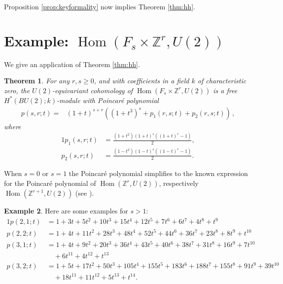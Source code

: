 \documentclass[oneside, a4paper, 12pt]{article}
\numberwithin{equation}{section}
\DeclareMathOperator{\Hom}{Hom}
\newcommand{\Z}{\mathbb{Z}}
\theoremstyle{plain}
\newtheorem{theorem}{Theorem}[section]
\theoremstyle{definition}
\newtheorem{example}[theorem]{Example}
\theoremstyle{remark}
\begin{document}
Proposition \ref{prop:keyformality} now implies Theorem \ref{thm:hh}.



\section{Example: $\Hom(F_s\times \Z^r,U(2))$} \label{sec:example}

We give an application of Theorem \ref{thm:hh}.

\begin{theorem} \label{thm:u2}
For any $r,s\geq 0$, and with coefficients in a field $k$ of characteristic zero, the $U(2)$-equivariant cohomology of $\Hom(F_s\times \Z^r,U(2))$ is a free $H^\ast(BU(2);k)$-module with Poincar{\'e} polynomial
\begin{equation*}
\begin{split}
p(s,r;t)=&(1+t)^{s+r}\left((1+t^3)^s+p_1(r,s;t)+p_2(r,s;t)\right)\, ,
\end{split}
\end{equation*}
where
\begin{alignat*}{1}
p_1(s,r;t) & =\frac{(1+t^2)(1+t)^s((1+t)^r-1)}{2}, \\
p_2(s,r;t) &=\frac{(1-t^2)(1-t)^s((1-t)^r-1)}{2}.
\end{alignat*}
\end{theorem}

When $s=0$ or $s=1$ the Poincar{\'e} polynomial simplifies to the known expression for the Poincar{\'e} polynomial of $\Hom(\Z^r,U(2))$, respectively $\Hom(\Z^{r+1},U(2))$ (see \cite[Example 6.2]{RS19}).

\begin{example} Here are some examples for $s>1$:
\begin{alignat*}{1}
p(2,1;t)&=1+3t+5t^2+10t^3+15t^4+12t^5+7t^6+6t^7+4t^8+t^9\\
p(2,2;t)&=1 + 4 t + 11 t^2 + 28 t^3 + 48 t^4 + 52 t^5 + 44 t^6 + 36 t^7 + 23 t^8 + 8 t^9 + t^{10} \\
p(3,1;t)&=1 + 4 t + 9 t^2 + 20 t^3 + 36 t^4 + 43 t^5 + 40 t^6 + 38 t^7 + 31 t^8 + 16 t^9 + 7 t^{10} \\&\quad + 6 t^{11} + 4 t^{12} + t^{13}\\
p(3,2;t)&=1 + 5 t + 17 t^2 + 50 t^3 + 105 t^4 + 155 t^5 + 183 t^6 + 188 t^7 + 155 t^8 + 91 t^9 + 39 t^{10}\\&\quad  + 18 t^{11} + 11 t^{12} + 5 t^{13} + t^{14}.
\end{alignat*}
\end{example}
\end{document}
